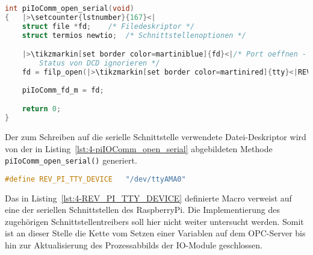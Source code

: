 \begin{lstlisting}[language={c},firstnumber=157,caption={Auszug der Methode \lstinline{piIOComm_open_serial} in \lstinline{piIOComm.c}\label{lst:4-piIOComm_open_serial}}]
int piIoComm_open_serial(void)
{   |>\setcounter{lstnumber}{167}<|
	struct file *fd;	/* Filedeskriptor */
	struct termios newtio;	/* Schnittstellenoptionen */

	|>\tikzmarkin[set border color=martiniblue]{fd}<|/* Port oeffnen - read/write, kein "controlling tty", 
	    Status von DCD ignorieren */
	fd = filp_open(|>\tikzmarkin[set border color=martinired]{tty}<|REV_PI_TTY_DEVICE|>\tikzmarkend{tty}<|, O_RDWR | O_NOCTTY, 0); |>\setcounter{lstnumber}{208}<|
	
	piIoComm_fd_m = fd;                                                      |>\tikzmarkend{fd}\setcounter{lstnumber}{217}<|

	return 0;
}
\end{lstlisting}

Der zum Schreiben auf die serielle Schnittstelle verwendete Datei-Deskriptor wird von der in Listing~\ref{lst:4-piIOComm_open_serial} abgebildeten Methode \lstinline{piIoComm_open_serial()} generiert. 

\begin{lstlisting}[language={c},firstnumber=45,caption={Definition der seriellen Schnittstelle in \lstinline{piIOComm.h}\label{lst:4-REV_PI_TTY_DEVICE}}]
#define REV_PI_TTY_DEVICE	"/dev/ttyAMA0"
\end{lstlisting}

Das in Listing~\ref{lst:4-REV_PI_TTY_DEVICE} definierte Macro verweist auf eine der seriellen Schnittstellen des RaspberryPi.
Die Implementierung des zugehörigen Schnittstellentreibers soll hier nicht weiter untersucht werden. Somit ist an dieser Stelle die Kette vom Setzen einer Variablen auf dem OPC-Server bis hin zur Aktualisierung des Prozessabbilds der IO-Module geschlossen.

